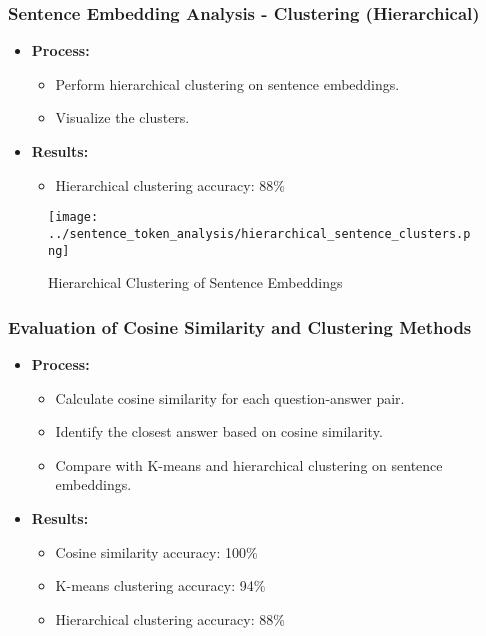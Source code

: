 \documentclass{beamer}
\begin{document}
\begin{frame}
\frametitle{Sentence Embedding Analysis - Clustering (Hierarchical)}
\begin{itemize}
    \item \textbf{Process:}
    \begin{itemize}
        \item Perform hierarchical clustering on sentence embeddings.
        \item Visualize the clusters.
    \end{itemize}
    \item \textbf{Results:} 
    \begin{itemize}
        \item Hierarchical clustering accuracy: 88\%
    \end{itemize}
\end{itemize}
\begin{figure}[h]
    \centering
    \texttt{[image: ../sentence\_token\_analysis/hierarchical\_sentence\_clusters.png]}
    \caption{Hierarchical Clustering of Sentence Embeddings}
\end{figure}
\end{frame}

\begin{frame}
\frametitle{Evaluation of Cosine Similarity and Clustering Methods}
\begin{itemize}
    \item \textbf{Process:}
    \begin{itemize}
        \item Calculate cosine similarity for each question-answer pair.
        \item Identify the closest answer based on cosine similarity.
        \item Compare with K-means and hierarchical clustering on sentence embeddings.
    \end{itemize}
    \item \textbf{Results:} 
    \begin{itemize}
        \item Cosine similarity accuracy: 100\%
        \item K-means clustering accuracy: 94\%
        \item Hierarchical clustering accuracy: 88\%
    \end{itemize}
\end{itemize}
\end{frame}
\end{document}
